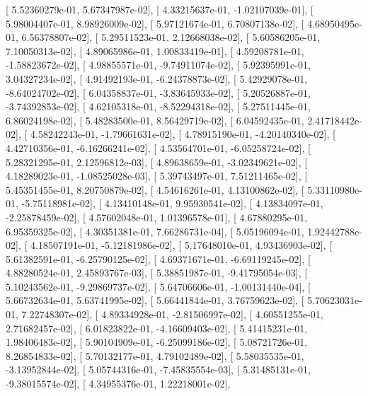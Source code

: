\documentclass{article}
\begin{document}
       [  5.52360279e-01,   5.67347987e-02],
       [  4.33215637e-01,  -1.02107039e-01],
       [  5.98004407e-01,   8.98926009e-02],
       [  5.97121674e-01,   6.70807138e-02],
       [  4.68950495e-01,   6.56378807e-02],
       [  5.29511523e-01,   2.12668038e-02],
       [  5.60586205e-01,   7.10050313e-02],
       [  4.89065986e-01,   1.00833419e-01],
       [  4.59208781e-01,  -1.58823672e-02],
       [  4.98855571e-01,  -9.74911074e-02],
       [  5.92395991e-01,   3.04327234e-02],
       [  4.91492193e-01,  -6.24378873e-02],
       [  5.42929078e-01,  -8.64024702e-02],
       [  6.04358837e-01,  -3.83645933e-02],
       [  5.20526887e-01,  -3.74392853e-02],
       [  4.62105318e-01,  -8.52294318e-02],
       [  5.27511445e-01,   6.86024198e-02],
       [  5.48283500e-01,   8.56429719e-02],
       [  6.04592435e-01,   2.41718442e-02],
       [  4.58242243e-01,  -1.79661631e-02],
       [  4.78915190e-01,  -4.20140340e-02],
       [  4.42710356e-01,  -6.16266241e-02],
       [  4.53564701e-01,  -6.05258724e-02],
       [  5.28321295e-01,   2.12596812e-03],
       [  4.89638659e-01,  -3.02349621e-02],
       [  4.18289023e-01,  -1.08525028e-03],
       [  5.39743497e-01,   7.51211465e-02],
       [  5.45351455e-01,   8.20750879e-02],
       [  4.54616261e-01,   4.13100862e-02],
       [  5.33110980e-01,  -5.75118981e-02],
       [  4.13410148e-01,   9.95930541e-02],
       [  4.13834097e-01,  -2.25878459e-02],
       [  4.57602048e-01,   1.01396578e-01],
       [  4.67880295e-01,   6.95359325e-02],
       [  4.30351381e-01,   7.66286731e-04],
       [  5.05196094e-01,   1.92442788e-02],
       [  4.18507191e-01,  -5.12181986e-02],
       [  5.17648010e-01,   4.93436903e-02],
       [  5.61382591e-01,  -6.25790125e-02],
       [  4.69371671e-01,  -6.69119245e-02],
       [  4.88280524e-01,   2.45893767e-03],
       [  5.38851987e-01,  -9.41795054e-03],
       [  5.10243562e-01,  -9.29869737e-02],
       [  5.64706606e-01,  -1.00131440e-04],
       [  5.66732634e-01,   5.63741995e-02],
       [  5.66441844e-01,   3.76759623e-02],
       [  5.70623031e-01,   7.22748307e-02],
       [  4.89334928e-01,  -2.81506997e-02],
       [  4.60551255e-01,   2.71682457e-02],
       [  6.01823822e-01,  -4.16609403e-02],
       [  5.41415231e-01,   1.98406483e-02],
       [  5.90104909e-01,  -6.25099186e-02],
       [  5.08721726e-01,   8.26854833e-02],
       [  5.70132177e-01,   4.79102489e-02],
       [  5.58035535e-01,  -3.13952844e-02],
       [  5.05744316e-01,  -7.45835554e-03],
       [  5.31485131e-01,  -9.38015574e-02],
       [  4.34955376e-01,   1.22218001e-02],
\end{document}
